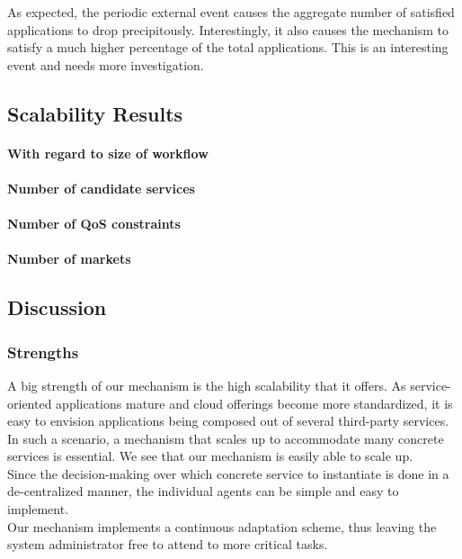\documentclass[10pt,journal,compsoc]{IEEEtran}
\begin{document}
As expected, the periodic external event causes the aggregate number of satisfied applications to drop precipitously. Interestingly, it also causes the mechanism to satisfy a much higher percentage of the total applications. This is an interesting event and needs more investigation.

\subsection{Scalability Results}
\paragraph{With regard to size of workflow}
\paragraph{Number of candidate services}
\paragraph{Number of QoS constraints}
\paragraph{Number of markets}

\subsection{Discussion}
\subsubsection{Strengths}
A big strength of our mechanism is the high scalability that it offers. As service-oriented applications mature and cloud offerings become more standardized, it is easy to envision applications being composed out of several third-party services. In such a scenario, a mechanism that scales up to accommodate many concrete services is essential. We see that our mechanism is easily able to scale up.\\
Since the decision-making over which concrete service to instantiate is done in a de-centralized manner, the individual agents can be simple and easy to implement. \\    
Our mechanism implements a continuous adaptation scheme, thus leaving the system administrator free to attend to more critical tasks.
\end{document}
